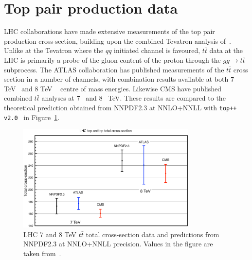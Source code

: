 \section{Top pair production data}
LHC collaborations have made extensive measurements of the top pair production cross-section, building upon the combined Tevatron analysis of~\cite{Aaltonen:2012ttbar}. Unlike at the Tevatron where the $qq$ initiated channel is favoured, $t\bar{t}$ data at the LHC is primarily a probe of the gluon content of the proton through the $gg \to t\bar{t}$ subprocess.
The ATLAS collaboration has published measurements of the $t\bar{t}$ cross section in a number of channels, with combination results available at both $7$ TeV~\cite{ATLAS:2012jyc} and $8$ TeV ~\cite{ATLAS:2012fja} centre of mass energies. Likewise CMS have published combined $t\bar{t}$ analyses at $7$~\cite{Chatrchyan:2012bra} and $8$~\cite{CMS:2012iba} TeV. These results are compared to the theoretical prediction obtained from NNPDF2.3 at NNLO+NNLL with { \tt top++ v2.0}~\cite{Czakon:2011xx} in Figure~\ref{fig:LHCttbar}.

\begin{figure}[!]
\centering
\includegraphics[width=0.8\textwidth]{5-LHCdata/figs/ttbar.eps}
\caption[LHC 7 and 8 TeV $t\bar{t}$ total cross-section data and predictions from NNPDF2.3]{LHC 7 and 8 TeV $t\bar{t}$ total cross-section data and predictions from NNPDF2.3 at NNLO+NNLL precision. Values in the figure are taken from~\cite{Czakon:2013tha}.}
\label{fig:LHCttbar}
\end{figure}

